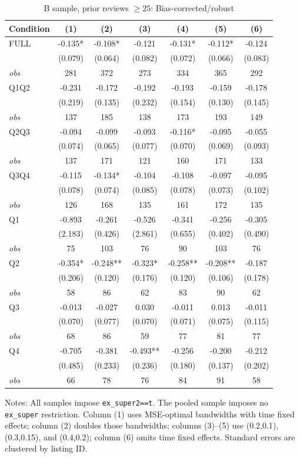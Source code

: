 \begin{table}[!htbp]
\centering
\caption{B sample, prior reviews $\geq25$: Bias-corrected/robust}
\begin{tabular}{lcccccc}
\toprule
Condition & (1) & (2) & (3) & (4) & (5) & (6) \\
\midrule
FULL & -0.135* & -0.108* & -0.121 & -0.131* & -0.112* & -0.124 \\
 & (0.079) & (0.064) & (0.082) & (0.072) & (0.066) & (0.083) \\
\textit{obs} & 281 & 372 & 273 & 334 & 365 & 292 \\
Q1Q2 & -0.231 & -0.172 & -0.192 & -0.193 & -0.159 & -0.178 \\
 & (0.219) & (0.135) & (0.232) & (0.154) & (0.130) & (0.145) \\
\textit{obs} & 137 & 185 & 138 & 173 & 193 & 149 \\
Q2Q3 & -0.094 & -0.099 & -0.093 & -0.116* & -0.095 & -0.055 \\
 & (0.074) & (0.065) & (0.077) & (0.070) & (0.069) & (0.093) \\
\textit{obs} & 137 & 171 & 121 & 160 & 171 & 133 \\
Q3Q4 & -0.115 & -0.134* & -0.104 & -0.108 & -0.097 & -0.095 \\
 & (0.078) & (0.074) & (0.085) & (0.078) & (0.073) & (0.102) \\
\textit{obs} & 126 & 168 & 135 & 161 & 172 & 135 \\
Q1 & -0.893 & -0.261 & -0.526 & -0.341 & -0.256 & -0.305 \\
 & (2.183) & (0.426) & (2.861) & (0.655) & (0.402) & (0.490) \\
\textit{obs} & 75 & 103 & 76 & 90 & 103 & 76 \\
Q2 & -0.354* & -0.248** & -0.323* & -0.258** & -0.208** & -0.187 \\
 & (0.206) & (0.120) & (0.176) & (0.120) & (0.106) & (0.178) \\
\textit{obs} & 58 & 86 & 62 & 83 & 90 & 62 \\
Q3 & -0.013 & -0.027 & 0.030 & -0.011 & 0.013 & -0.011 \\
 & (0.070) & (0.077) & (0.070) & (0.071) & (0.075) & (0.115) \\
\textit{obs} & 68 & 86 & 59 & 77 & 81 & 77 \\
Q4 & -0.705 & -0.381 & -0.493** & -0.256 & -0.200 & -0.212 \\
 & (0.485) & (0.233) & (0.236) & (0.180) & (0.137) & (0.202) \\
\textit{obs} & 66 & 78 & 76 & 84 & 91 & 58 \\
\bottomrule
\end{tabular}
\begin{minipage}{0.98\textwidth}\footnotesize
Notes: All samples impose \texttt{ex\_super2==t}. The pooled sample imposes no \texttt{ex\_super} restriction. Column (1) uses MSE-optimal bandwidths with time fixed effects; column (2) doubles those bandwidths; columns (3)--(5) use (0.2,0.1), (0.3,0.15), and (0.4,0.2); column (6) omits time fixed effects. Standard errors are clustered by listing ID.
\end{minipage}
\end{table}

